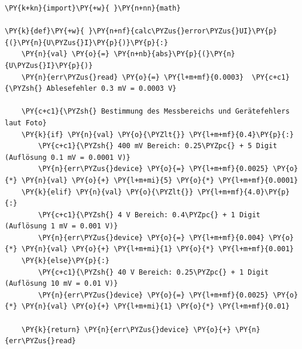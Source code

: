     \begin{tcolorbox}[breakable, size=fbox, boxrule=1pt, pad at break*=1mm,colback=cellbackground, colframe=cellborder]
\begin{Verbatim}[commandchars=\\\{\}]
\PY{k+kn}{import}\PY{+w}{ }\PY{n+nn}{math}

\PY{k}{def}\PY{+w}{ }\PY{n+nf}{calc\PYZus{}error\PYZus{}UI}\PY{p}{(}\PY{n}{U\PYZus{}I}\PY{p}{)}\PY{p}{:}
    \PY{n}{val} \PY{o}{=} \PY{n+nb}{abs}\PY{p}{(}\PY{n}{U\PYZus{}I}\PY{p}{)}
    \PY{n}{err\PYZus{}read} \PY{o}{=} \PY{l+m+mf}{0.0003}  \PY{c+c1}{\PYZsh{} Ablesefehler 0.3 mV = 0.0003 V}
    
    \PY{c+c1}{\PYZsh{} Bestimmung des Messbereichs und Gerätefehlers laut Foto}
    \PY{k}{if} \PY{n}{val} \PY{o}{\PYZlt{}} \PY{l+m+mf}{0.4}\PY{p}{:}
        \PY{c+c1}{\PYZsh{} 400 mV Bereich: 0.25\PYZpc{} + 5 Digit (Auflösung 0.1 mV = 0.0001 V)}
        \PY{n}{err\PYZus{}device} \PY{o}{=} \PY{l+m+mf}{0.0025} \PY{o}{*} \PY{n}{val} \PY{o}{+} \PY{l+m+mi}{5} \PY{o}{*} \PY{l+m+mf}{0.0001}
    \PY{k}{elif} \PY{n}{val} \PY{o}{\PYZlt{}} \PY{l+m+mf}{4.0}\PY{p}{:}
        \PY{c+c1}{\PYZsh{} 4 V Bereich: 0.4\PYZpc{} + 1 Digit (Auflösung 1 mV = 0.001 V)}
        \PY{n}{err\PYZus{}device} \PY{o}{=} \PY{l+m+mf}{0.004} \PY{o}{*} \PY{n}{val} \PY{o}{+} \PY{l+m+mi}{1} \PY{o}{*} \PY{l+m+mf}{0.001}
    \PY{k}{else}\PY{p}{:}
        \PY{c+c1}{\PYZsh{} 40 V Bereich: 0.25\PYZpc{} + 1 Digit (Auflösung 10 mV = 0.01 V)}
        \PY{n}{err\PYZus{}device} \PY{o}{=} \PY{l+m+mf}{0.0025} \PY{o}{*} \PY{n}{val} \PY{o}{+} \PY{l+m+mi}{1} \PY{o}{*} \PY{l+m+mf}{0.01}
        
    \PY{k}{return} \PY{n}{err\PYZus{}device} \PY{o}{+} \PY{n}{err\PYZus{}read}


\end{Verbatim}
\end{tcolorbox}
